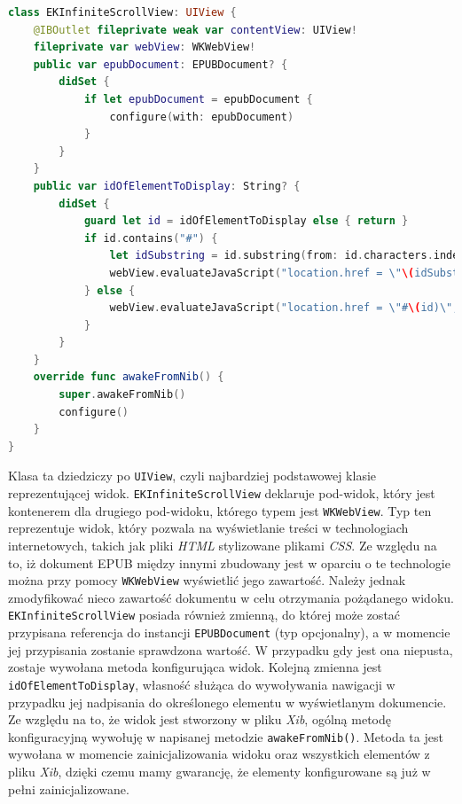 \begin{lstlisting}[language=swift,caption={Deklaracja klasy \texttt{EKInfiniteScrollView}}, label=EKInfiniteScrollView-declaration]
class EKInfiniteScrollView: UIView {
    @IBOutlet fileprivate weak var contentView: UIView!
    fileprivate var webView: WKWebView!
    public var epubDocument: EPUBDocument? {
        didSet {
            if let epubDocument = epubDocument {
                configure(with: epubDocument)
            }
        }
    }
    public var idOfElementToDisplay: String? {
        didSet {
            guard let id = idOfElementToDisplay else { return }
            if id.contains("#") {
                let idSubstring = id.substring(from: id.characters.index(of: "#")!)
                webView.evaluateJavaScript("location.href = \"\(idSubstring)\";")
            } else {
                webView.evaluateJavaScript("location.href = \"#\(id)\";")
            }
        }
    }
    override func awakeFromNib() {
        super.awakeFromNib()
        configure()
    }
}
\end{lstlisting}

Klasa ta dziedziczy po \texttt{UIView}, czyli najbardziej podstawowej klasie reprezentującej widok. \texttt{EKInfiniteScrollView} deklaruje pod-widok, który jest kontenerem dla drugiego pod-widoku, którego typem jest \texttt{WKWebView}. Typ ten reprezentuje widok, który pozwala na wyświetlanie treści w technologiach internetowych, takich jak pliki \textit{HTML} stylizowane plikami \textit{CSS}. Ze względu na to, iż dokument EPUB między innymi zbudowany jest w oparciu o te technologie można przy pomocy \texttt{WKWebView} wyświetlić jego zawartość. Należy jednak zmodyfikować nieco zawartość dokumentu w celu otrzymania pożądanego widoku. \texttt{EKInfiniteScrollView} posiada również zmienną, do której może zostać przypisana referencja do instancji \texttt{EPUBDocument} (typ opcjonalny), a w momencie jej przypisania zostanie sprawdzona wartość. W przypadku gdy jest ona niepusta, zostaje wywołana metoda konfigurująca widok. Kolejną zmienna jest \texttt{idOfElementToDisplay}, własność służąca do wywoływania nawigacji w przypadku jej nadpisania do określonego elementu w wyświetlanym dokumencie. Ze względu na to, że widok jest stworzony w pliku \textit{Xib}, ogólną metodę konfiguracyjną wywołuję w napisanej metodzie \texttt{awakeFromNib()}. Metoda ta jest wywołana w momencie zainicjalizowania widoku oraz wszystkich elementów z pliku \textit{Xib}, dzięki czemu mamy gwarancję, że elementy konfigurowane są już w pełni zainicjalizowane.


